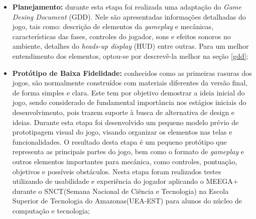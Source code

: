 \documentclass[10pt, conference, compsocconf]{IEEEtran}
\begin{document}
\begin{itemize}
	\item \textbf{Planejamento:} durante esta etapa foi realizada uma adaptação do \textit{Game Desing Document} (GDD). Nele são apresentadas informações detalhadas do jogo, tais como: descrição de elementos da \textit{gameplay} e mecânicas, características das fases, controles do jogador, sons e efeitos sonoros no ambiente, detalhes do \textit{heads-up display} (HUD) entre outras. Para um melhor entendimento dos elementos, optou-se por descrevê-la melhor na seção \ref{gdd};	

	\item \textbf{Protótipo de Baixa Fidelidade:} conhecidos como as primeiras rasuras dos jogos, são normalmente construídos com materiais diferentes da versão final, de forma simples e clara. Este tem por objetivo demostrar a ideia inicial do jogo, sendo considerado de fundamental importância nos estágios iniciais do desenvolvimento, pois trazem suporte à busca de alternativa de design e ideias. Durante esta etapa foi desenvolvido um pequeno modelo prévio de prototipagem visual do jogo, visando organizar os elementos nas telas e funcionalidades. O resultado desta etapa é um pequeno protótipo que representa as principais partes do jogo, bem como o formato de \textit{gameplay} e outros elementos importantes para mecânica, como controles, pontuação, objetivos e possíveis obstáculos. Nesta etapa foram realizados testes utilizando de usabilidade e experiência do jogador aplicando o MEEGA+ durante o SNCT(Semana Nacional de Ciência e Tecnologia) na Escola Superior de Tecnologia do Amazonas(UEA-EST) para alunos do núcleo de computação e tecnologia;
	
	

\end{itemize}
\end{document}
